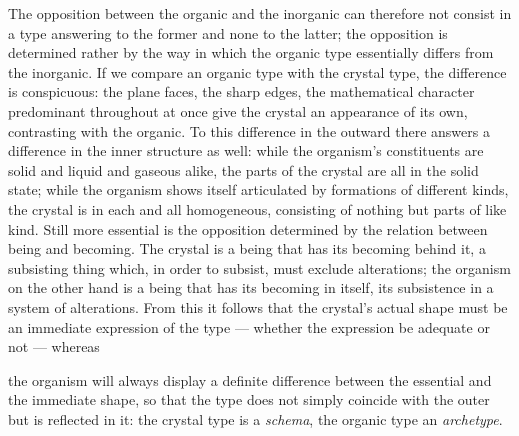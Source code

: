 \documentclass[12pt,a4paper]{book}
\begin{document}
The opposition between the organic and the inorganic can therefore not consist
in a type answering to the former and none to the latter; the opposition is
determined rather by the way in which the organic type essentially differs from
the inorganic. If we compare an organic type with the crystal type, the
difference is conspicuous: the plane faces, the sharp edges, the mathematical
character predominant throughout at once give the crystal an appearance of its
own, contrasting with the organic. To this difference in the outward there
answers a difference in the inner structure as well: while the organism's
constituents are solid and liquid and gaseous alike, the parts of the crystal
are all in the solid state; while the organism shows itself articulated by
formations of different kinds, the crystal is in each and all homogeneous,
consisting of nothing but parts of like kind. Still more essential is the
opposition determined by the relation between being and becoming. The crystal
is a being that has its becoming behind it, a subsisting thing which, in order
to subsist, must exclude alterations; the organism on the other hand is a being
that has its becoming in itself, its subsistence in a system of alterations.
From this it follows that the crystal's actual shape must be an immediate
expression of the type --- whether the expression be adequate or not --- whereas

\setcounter{footnote}{0}
the organism will always display a definite difference between the essential
and the immediate shape, so that the type does not simply coincide with the
outer but is reflected in it: the crystal type is a \emph{schema}, the organic
type an \emph{archetype}.
\end{document}
